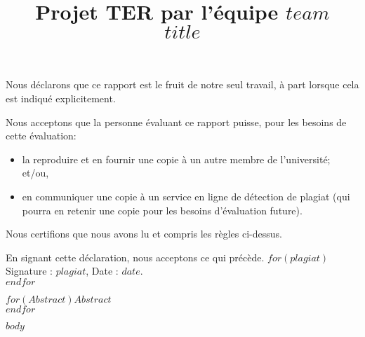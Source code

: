\documentclass[mstat,12pt]{unswthesis}
\title{Projet TER par l'équipe $team$\\[0.5cm]$title$}
\author{\Authornameonly}
\begin{document}
\beforepreface




\vskip 2pc \noindent Nous déclarons que ce rapport est le fruit de notre seul travail, à part lorsque cela est indiqué  explicitement. 

\vskip 2pc  \noindent Nous acceptons que la personne évaluant ce rapport puisse, pour les besoins de cette évaluation:
\begin{itemize}
\item la reproduire et en fournir une copie à un autre membre de l'université; et/ou,
\item en communiquer une copie à un service en ligne de détection de plagiat (qui pourra en retenir une copie pour les besoins d'évaluation future).
\end{itemize}

\vskip 2pc \noindent Nous certifions que nous avons lu et compris les règles ci-dessus.\vspace{24pt}

\vskip 2pc \noindent En signant cette déclaration, nous acceptons ce qui précède.
\vskip 2pc \noindent
$for(plagiat)$
Signature : \textbf{\textit{$plagiat$}},   Date : \textbf{\textit{$date$}}. \\[1cm]
$endfor$
\vskip 1pc










$for(Abstract)$$Abstract$\\[1cm] $endfor$



\afterpreface





%
%






$body$
\end{document}
